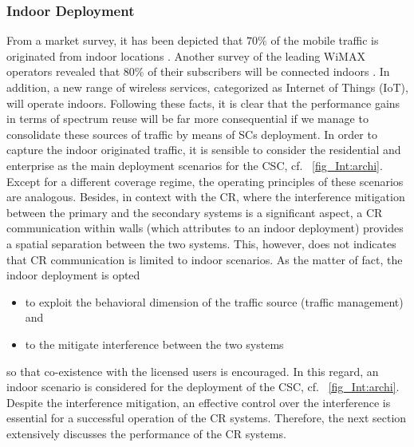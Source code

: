 \subsubsection*{Indoor Deployment}
From a market survey, it has been depicted that $70\%$ of the mobile traffic is originated from indoor locations \cite{Chander08}. Another survey of the leading WiMAX operators revealed that $80\%$ of their subscribers will be connected indoors \cite{Pao07}. In addition, a new range of wireless services, categorized as Internet of Things (IoT), will operate indoors. Following these facts, it is clear that the performance gains in terms of spectrum reuse will be far more consequential if we manage to consolidate these sources of traffic by means of SCs deployment. In order to capture the indoor originated traffic, it is sensible to consider the residential and enterprise as the main deployment scenarios for the CSC, cf. \figurename~\ref{fig_Int:archi}. Except for a different coverage regime, the operating principles of these scenarios are analogous. Besides, in context with the CR, where the interference mitigation between the primary and the secondary systems is a significant aspect, a CR communication within walls (which attributes to an indoor deployment) provides a spatial separation between the two systems. This, however, does not indicates that CR communication is limited to indoor scenarios. As the matter of fact, the indoor deployment is opted \begin{itemize} \item to exploit the behavioral dimension of the traffic source (traffic management) and \item to the mitigate interference between the two systems \end{itemize} so that co-existence with the licensed users is encouraged. 
In this regard, an indoor scenario is considered for the deployment of the CSC, cf. \figurename~\ref{fig_Int:archi}. Despite the interference mitigation, an effective control over the interference is essential for a successful operation of the CR systems. Therefore, the next section extensively discusses the performance of the CR systems. 


